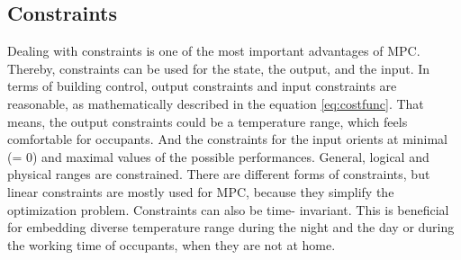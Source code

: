 \subsection{Constraints}
\label{subsection:constraints}

Dealing with constraints is one of the most important advantages of MPC. Thereby, constraints can be used for the state, the output, and the input. In terms of building control, output constraints and input constraints are reasonable, as mathematically described in the equation \ref{eq:costfunc}. That means, the output constraints could be a temperature range, which feels comfortable for occupants. And the constraints for the input orients at minimal (= 0) and maximal values of the possible performances. General, logical and physical ranges are constrained. There are different forms of constraints, but linear constraints are mostly used for MPC, because they simplify the optimization problem. Constraints can also be time- invariant. This is beneficial for embedding diverse temperature range during the night and the day or during the working time of occupants, when they are not at home.
\cite{Siroky.2011}
